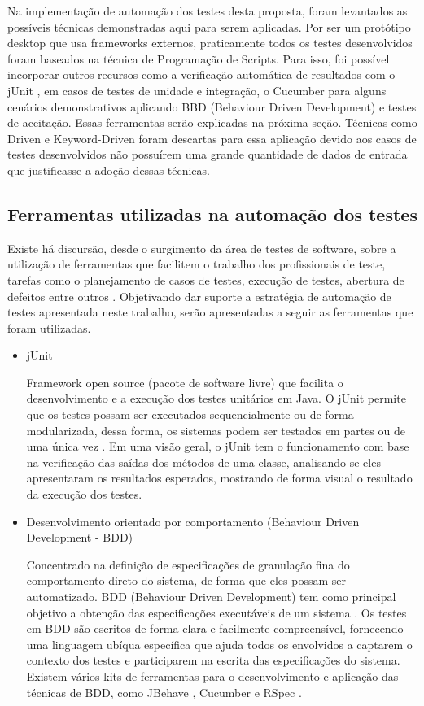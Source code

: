 Na implementação de automação dos testes desta proposta, foram levantados as possíveis técnicas demonstradas aqui para serem aplicadas. Por ser um protótipo desktop que usa frameworks externos, praticamente todos os testes desenvolvidos foram baseados na técnica de Programação de Scripts. Para isso, foi possível incorporar outros recursos como a verificação automática de resultados com o jUnit \cite{JUnit}, em casos de testes de unidade e integração, o Cucumber \cite{Cucumber} para alguns cenários demonstrativos aplicando BBD (Behaviour Driven Development) e testes de aceitação. Essas ferramentas serão explicadas na próxima seção. Técnicas como Driven e Keyword-Driven foram descartas para essa aplicação devido aos casos de testes desenvolvidos não possuírem uma grande quantidade de dados de entrada que justificasse a adoção dessas técnicas.

\subsection{Ferramentas utilizadas na automação dos testes}

Existe há discursão, desde o surgimento da área de testes de software, sobre a utilização de ferramentas que facilitem o trabalho dos profissionais de teste, tarefas como o planejamento de casos de testes, execução de testes, abertura de defeitos entre outros \cite{Solis2011}. Objetivando dar suporte a estratégia  de automação de testes apresentada neste trabalho, serão apresentadas a seguir as ferramentas que foram utilizadas.

\begin{itemize}

	\item  jUnit 

Framework open source (pacote de software livre) que facilita o desenvolvimento e a execução dos testes unitários em Java. O jUnit permite que os testes possam ser executados sequencialmente ou de forma modularizada, dessa forma, os sistemas podem ser testados em partes ou de uma única vez \cite{JUnit}. Em uma visão geral, o jUnit tem o funcionamento com base na verificação das saídas dos métodos de uma classe, analisando se eles apresentaram os resultados esperados, mostrando de forma visual o resultado da execução dos testes.
	
	\item Desenvolvimento orientado por comportamento (Behaviour Driven Development - BDD)
	
Concentrado na definição de especificações de granulação fina do comportamento direto do sistema, de forma que eles possam ser automatizado. BDD (Behaviour Driven Development) tem como principal objetivo a obtenção das especificações executáveis de um sistema \cite{Solis2011}. Os testes em BDD são escritos de forma clara e facilmente compreensível, fornecendo uma linguagem ubíqua específica que ajuda todos os envolvidos a captarem o contexto dos testes e participarem na escrita das especificações do sistema. Existem vários kits de ferramentas para o desenvolvimento e aplicação das técnicas de BDD, como JBehave \cite{JBehave}, Cucumber \cite{Cucumber} e RSpec \cite{RSpec}.

\end{itemize}

